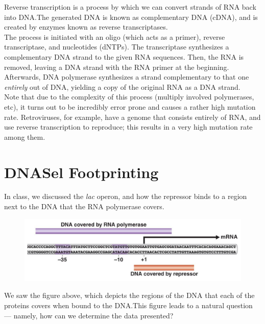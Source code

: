 \documentclass{article}
\begin{document}
Reverse transcription is a process by which we can convert strands of RNA back into DNA.\@ The
generated DNA is known as complementary DNA (cDNA), and is created by enzymes known as reverse
transcriptases. \\

The process is initiated with an oligo (which acts as a primer), reverse transcriptase, and
nucleotides (dNTPs). The transcriptase synthesizes a complementary DNA strand to the given RNA
sequences. Then, the RNA is removed, leaving a DNA strand with the RNA primer at the beginning.
Afterwards, DNA polymerase synthesizes a strand complementary to that one  \emph{entirely} out of
DNA, yielding a copy of the original RNA as a DNA strand.\\

Note that due to the complexity of this process (multiply involved polymerases, etc), it turns out
to be incredibly error prone and causes a rather high mutation rate. Retroviruses, for example, have
a genome that consists entirely of RNA, and use reverse transcription to reproduce; this results in
a very high mutation rate among them.

\section*{DNASel Footprinting}

In class, we discussed the \emph{lac} operon, and how the repressor binds to a region next to the
DNA that the RNA polymerase covers. 

\begin{figure}[h!]
    \centering
    \includegraphics[scale=0.2]{images/lac-repressor.png}
\end{figure}

We saw the figure above, which depicts the regions of the DNA that each of the proteins covers when
bound to the DNA.\@ This figure leads to a natural question --- namely, how can we determine the data
presented?
\end{document}
